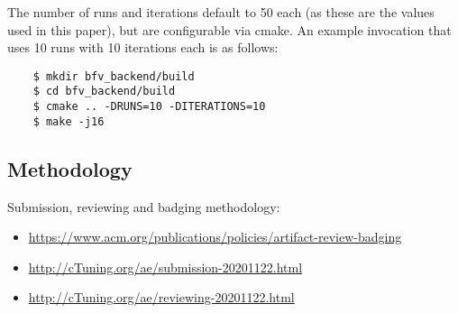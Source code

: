 The number of runs and iterations default to 50 each (as these are the values used in this paper), but are configurable via cmake. An example invocation that uses 10 runs with 10 iterations each is as follows:

\begin{verbatim}
    $ mkdir bfv_backend/build
    $ cd bfv_backend/build
    $ cmake .. -DRUNS=10 -DITERATIONS=10
    $ make -j16
\end{verbatim}
\subsection{Methodology}

Submission, reviewing and badging methodology:

\begin{itemize}
  \item \url{https://www.acm.org/publications/policies/artifact-review-badging}
  \item \url{http://cTuning.org/ae/submission-20201122.html}
  \item \url{http://cTuning.org/ae/reviewing-20201122.html}
\end{itemize}
